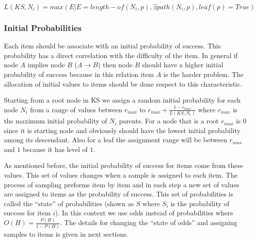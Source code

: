 \begin{equation}
L(KS,N_{i}) = max(E|E=length-of(N_{i},p)  ,  \exists path(N_{i},p)  , leaf(p)=True)
\label{EQ:Level}
\end{equation}


\subsubsection{Initial Probabilities}

Each item should be associate with an initial probability of success. This probability has a direct correlation with the difficulty of the item. In general if node $A$ implies node $B$ ($A \rightarrow B$) then node $B$ should have a higher initial probability of success because in this relation item $A$ is the harder problem. The allocation of initial values to items should be done respect to this characteristic. 

Starting from a root node in KS we assign a random initial probability  for each node $N_{i}$ from a range of values between $r_{max}$ to $r_{max}+\frac{1-r_{max}}{L(KS,N_{i})}$ where $r_{max}$ is the maximum initial probability of $N_{i}$ parents. For a node that is a root $r_{max}$ is $0$ since it is starting node and obviously should have the lowest initial probability among its descendant. Also for a leaf the assignment range will be between $r_{max}$ and $1$ because it has level of $1$. 

As mentioned before, the initial probability of success for items come from these values. This set of values changes when a sample is assigned to each item. The process of sampling preforms item by item and in each step a new set of values are assigned to items as the probability of success. This set of probabilities is called the ``state'' of probabilities (shown as $S$ where $S_i$ is the probability of success for item $i$). In this context we use odds instead of probabilities where $O(H) = \frac{P(H)}{1-P(H)}$. The details for changing the ``state of odds'' and assigning samples to items is given in next sections.

